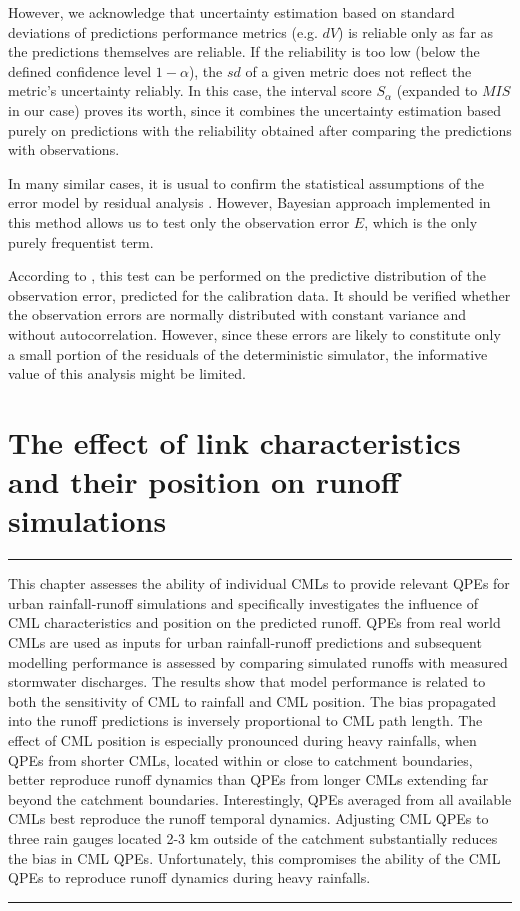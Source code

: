 \documentclass{ctuthesis}\usepackage[]{graphicx}\usepackage[]{color}
\begin{document}
However, we acknowledge that  uncertainty estimation based on  standard deviations of  predictions performance metrics (e.g. $dV$)  is reliable only as far as the predictions themselves are reliable. If the reliability is too low (below the defined confidence level $1- \alpha$), the $sd$ of a given metric does not reflect the metric's uncertainty reliably. In this case, the interval score $S_\alpha$ (expanded to  $M\!I\!S$ in our case) proves its worth, since it combines the uncertainty estimation based purely on predictions with the reliability obtained after comparing the predictions with observations.

In many similar cases, it is usual to confirm the statistical assumptions of the error model by residual analysis \citep{reichert2012linking}. However, Bayesian approach implemented in this method allows us to test only the observation error $E$, which is the only purely frequentist term. 

According to \cite{giudice2013improving}, this test can be performed on the predictive distribution of the observation error, predicted for the calibration data. It should be verified whether the observation errors are normally distributed with constant variance and without autocorrelation. However, since these errors are likely to constitute only a small portion of the residuals of the deterministic simulator, the informative value of this analysis might be limited.


        
        


\chapter{The effect of link characteristics and their position on runoff simulations} \label{chap4}

\rule{\textwidth}{0.4pt}
This chapter assesses the ability of individual CMLs to provide relevant QPEs for urban rainfall-runoff simulations and specifically investigates the influence of CML characteristics and position on the predicted runoff. QPEs from real world CMLs are used as inputs for urban rainfall-runoff predictions and subsequent modelling performance is assessed by comparing simulated runoffs with measured stormwater discharges. The results show that model performance is related to both the sensitivity of CML to rainfall and CML position. The bias propagated into the runoff predictions is inversely proportional to CML path length. The effect of CML position is especially pronounced during heavy rainfalls, when QPEs from shorter CMLs, located within or close to catchment boundaries, better reproduce runoff dynamics than QPEs from longer CMLs extending far beyond the catchment boundaries. Interestingly, QPEs averaged from all available CMLs best reproduce the runoff temporal dynamics. Adjusting CML QPEs to three rain gauges located 2-3 km outside of the catchment substantially reduces the bias in CML QPEs. Unfortunately, this compromises the ability of the CML QPEs to reproduce runoff dynamics during heavy rainfalls.
\rule[0.2cm]{\textwidth}{0.4pt}
\end{document}
